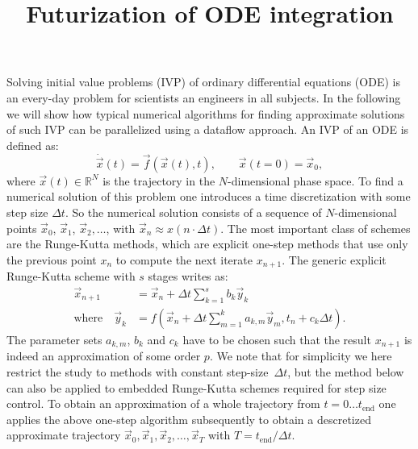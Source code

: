 \documentclass[a4wide,10pt]{scrartcl}
\title{Futurization of ODE integration}
\author{}
\newcommand{\Dt}{\Delta t}
\begin{document}
\maketitle

Solving initial value problems (IVP) of ordinary differential equations (ODE) is an every-day problem for scientists an engineers in all subjects.
In the following we will show how typical numerical algorithms for finding approximate solutions of such IVP can be parallelized using a dataflow approach.
An IVP of an ODE is defined as:
\begin{equation}
 \dot{\vec x}(t) = \vec f(\vec x(t), t), \qquad \vec x(t=0) = \vec x_0,
\end{equation}
where $\vec x(t) \in \mathbb{R}^N$ is the trajectory in the $N$-dimensional phase space.
To find a numerical solution of this problem one introduces a time discretization with some step size $\Dt$.
So the numerical solution consists of a sequence of $N$-dimensional points $\vec x_0$, $\vec x_1$, $\vec x_2,\dots$, with $\vec x_n \approx x(n\cdot \Dt)$.
The most important class of schemes are the Runge-Kutta methods, which are explicit one-step methods that use only the previous point $x_n$ to compute the next iterate $x_{n+1}$.
The generic explicit Runge-Kutta scheme with $s$ stages writes as:
\begin{equation} \label{eqn:rk}
 \begin{aligned}
    \vec x_{n+1} &= \vec x_n + \Dt \sum_{k=1}^{s} b_k \vec y_k \\
    \text{where}\quad \vec y_k &= f( \vec x_n + \Dt \sum_{m=1}^k a_{k,m} \vec y_m , t_n+c_k\Dt).
   \end{aligned}
\end{equation}
The parameter sets $a_{k,m}$, $b_k$ and $c_k$ have to be chosen such that the result $x_{n+1}$ is indeed an approximation of some order $p$.
We note that for simplicity we here restrict the study to methods with constant step-size~$\Dt$, but the method below can also be applied to embedded Runge-Kutta schemes required for step size control.
To obtain an approximation of a whole trajectory from $t=0\dots t_\text{end}$ one applies the above one-step algorithm subsequently to obtain a descretized approximate trajectory $\vec x_0,\vec x_1,\vec x_2,\dots,\vec x_T$ with $T=t_\text{end}/\Dt$.
\end{document}
